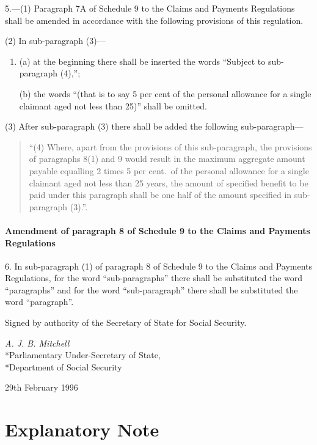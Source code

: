\documentclass[a4paper]{article}
\begin{document}
5.—(1) Paragraph 7A of Schedule 9 to the Claims and Payments Regulations shall be amended in accordance with the following provisions of this regulation.

(2) In sub-paragraph (3)—
\begin{enumerate}\item[]
(a) at the beginning there shall be inserted the words “Subject to sub-paragraph (4),”;

(b) the words “(that is to say 5 per cent of the personal allowance for a single claimant aged not less than 25)” shall be omitted.
\end{enumerate}

(3) After sub-paragraph (3) there shall be added the following sub-\hspace{0pt}paragraph—
\begin{quotation}
“(4) Where, apart from the provisions of this sub-paragraph, the provisions of paragraphs 8(1) and 9 would result in the maximum aggregate amount payable equalling 2 times 5 per cent.\ of the personal allowance for a single claimant aged not less than 25 years, the amount of specified benefit to be paid under this paragraph shall be one half of the amount specified in sub-paragraph (3).”.
\end{quotation}

\subsection[6. Amendment of paragraph 8 of Schedule 9 to the Claims and Payments Regulations]{Amendment of paragraph 8 of Schedule 9 to the Claims and Payments Regulations}

6.  In sub-paragraph (1) of paragraph 8 of Schedule 9 to the Claims and Payments Regulations, for the word “sub-paragraphs” there shall be substituted the word “paragraphs” and for the word “sub-paragraph” there shall be substituted the word “paragraph”.

\bigskip

Signed by authority of the Secretary of State for Social Security.

{\raggedleft
\emph{A. J. B. Mitchell}\\*Parliamentary Under-Secretary of State,\\*Department of Social Security

}

29th February 1996

\part{Explanatory Note}
\end{document}
